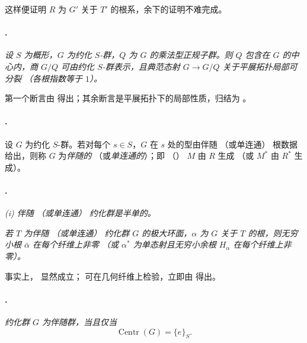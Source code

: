 这样便证明 \(R\) 为 \(G'\) 关于 \(T'\) 的根系，余下的证明不难完成。

\paragraph{.}
\textit{设 \(S\) 为概形，\(G\) 为约化 \(S\)-群，\(Q\) 为 \(G\) 的乘法型正规子群。则 \(Q\) 包含在 \(G\) 的中心内，商 \(G/Q\) 可由约化 \(S\)-群表示，且典范态射 \(G\to G/Q\) 关于平展拓扑局部可分裂 \textup{（各根指数等于 \(1\)）}。}

第一个断言由 得出；其余断言是平展拓扑下的局部性质，归结为 。

\paragraph{.}
设 \(G\) 为约化 \(S\)-群。若对每个 \(s\in S\)，\(G\) 在 \(s\) 处的型由伴随 \textup{（或单连通）} 根数据给出，则称 \(G\) 为\emph{伴随的} \textup{（或\emph{单连通的}）}；即 \textup{（）} \(M\) 由 \(R\) 生成 \textup{（或 \(M^*\) 由 \(R^*\) 生成）}。

\paragraph{.}
\textit{\textup{(i)} 伴随 \textup{（或单连通）} 约化群是半单的。}

\textit{\textup{} 若 \(T\) 为伴随 \textup{（或单连通）} 约化群 \(G\) 的极大环面，\(\alpha\) 为 \(G\) 关于 \(T\) 的根，则无穷小根 \(\bar\alpha\) 在每个纤维上非零 \textup{（或 \(\alpha^*\) 为单态射且无穷小余根 \(H_\alpha\) 在每个纤维上非零）}。}

事实上，\textup{} 显然成立；\textup{} 可在几何纤维上检验，立即由 得出。

\paragraph{.}
\textit{\textup{} 约化群 \(G\) 为伴随群，当且仅当}
\[
  \operatorname{Centr}(G)=\{e\}_S.
\]

